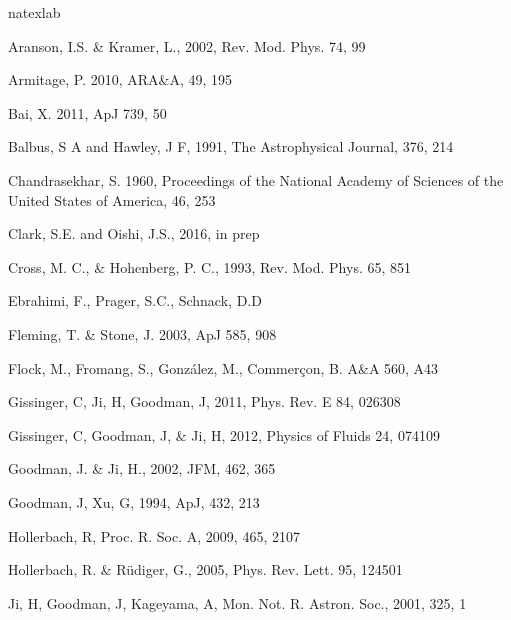 \documentclass{emulateapj}
\begin{document}


\begin{thebibliography}{53}
\expandafter\ifx\csname natexlab\endcsname\relax\def\natexlab#1{#1}\fi

Aranson, I.S. \& Kramer, L., 2002, Rev. Mod. Phys. 74, 99

Armitage, P. 2010, ARA\&A, 49, 195

Bai, X. 2011, ApJ 739, 50

Balbus, S A and Hawley, J F, 1991, The Astrophysical Journal, 376, 214

Chandrasekhar, S. 1960, Proceedings of the National Academy of Sciences of the United States of America, 46, 253

Clark, S.E. and Oishi, J.S., 2016, in prep

Cross, M. C., \& Hohenberg, P. C., 1993, Rev. Mod. Phys. 65, 851

Ebrahimi, F., Prager, S.C., Schnack, D.D

Fleming, T. \& Stone, J. 2003, ApJ 585, 908

Flock, M., Fromang, S., Gonz\'alez, M., Commer\c{c}on, B. A\&A 560, A43

Gissinger, C, Ji, H, Goodman, J, 2011, Phys. Rev. E 84, 026308

Gissinger, C, Goodman, J, \& Ji, H, 2012, Physics of Fluids 24, 074109

Goodman, J. \& Ji, H., 2002, JFM, 462, 365

Goodman, J, Xu, G, 1994, ApJ, 432, 213

Hollerbach, R, Proc. R. Soc. A, 2009, 465, 2107

Hollerbach, R. \& R\"udiger, G., 2005, Phys. Rev. Lett. 95, 124501

Ji, H, Goodman, J, Kageyama, A, Mon. Not. R. Astron. Soc., 2001, 325, 1


\end{thebibliography}
\end{document}

